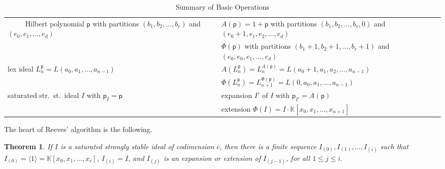 \documentclass[12pt]{amsart}%
\newtheorem{theorem}{Theorem}[section]
\theoremstyle{definition}%
\newcommand{\hp}{\mathsf{p}}%
\newcommand{\lift}{\Phi}%
\newcommand{\plus}{A}%
\newcommand{\kk}{\mathbb{K}}%
\newcommand{\relphantom}[1]{\mathrel{\phantom{ #1 }}}
\begin{document}
\begin{table}
  \caption{Summary of Basic Operations}
  \centering
  {\renewcommand{\arraystretch}{1.5}
  \begin{tabular}{|p{}|p{}|}
    \hline
    
    \multirow{2}{*}{\parbox{.4\textwidth}{$\relphantom{www}$
        \\ Hilbert polynomial $\hp$ with partitions \\ $(b_1, b_2,
        \ldots, b_r)$ and $(e_0, e_1, \ldots, e_d)$}} &

    $\plus(\hp) = 1+\hp$ with partitions $(b_1, b_2, \ldots, b_r, 0)$
    and $(e_0+1, e_1, e_2, \ldots, e_d)$ \\ \cline{2-2}

    & $\lift(\hp)$ with partitions $(b_1+1, b_2+1, \ldots, b_r+1)$ and
    $(e_0, e_0, e_1, \ldots, e_d)$ \\ \hline

    \multirow{2}{*}{lex ideal $L^{\hp}_n = L(a_0, a_1, \ldots,
      a_{n-1})$} &
    
    $\plus(L^{\hp}_n) = L^{\plus(\hp)}_n = L(a_0+1, a_1, a_2, \ldots,
    a_{n-1})$ \\ \cline{2-2}

    & $\lift (L^{\hp}_n) = L^{\lift(\hp)}_{n+1} = L(0, a_0, a_1,
    \ldots, a_{n-1})$ \\ \hline
    
    \multirow{2}{*}{saturated str.\ st.\ ideal $I$ with $\hp_I = \hp$} &

    expansion $I'$ of $I$ with $\hp_{I'} = \plus(\hp)$ \\ \cline{2-2}

    & extension $\lift(I) = I \cdot \kk[x_0, x_1, \ldots, x_{n+1}]$
    \\ \hline
  \end{tabular}}
\end{table}

The heart of Reeves' algorithm \cite{Reeves--1992} is the following.

\begin{theorem}
  \label{thm:algorithm}
  If $I$ is a saturated strongly stable ideal of codimension $c$, then
  there is a finite sequence $I_{(0)}, I_{(1)}, \ldots, I_{(i)}$ such
  that $I_{(0)} = \langle 1 \rangle = \kk[x_0, x_1, \dotsc, x_c]$,
  $I_{(i)} = I$, and $I_{(j)}$ is an expansion or extension of
  $I_{(j-1)}$, for all $1 \le j \le i$.
\end{theorem}
\end{document}
